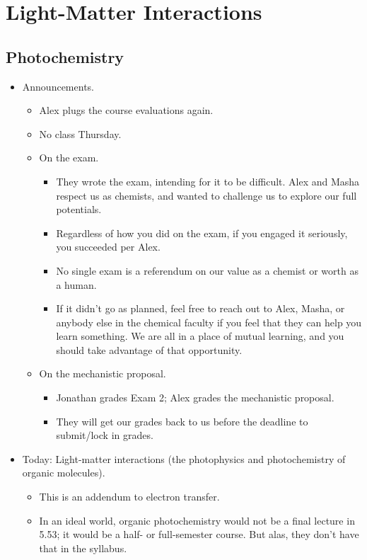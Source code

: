 \documentclass[../notes.tex]{subfiles}
\begin{document}
\chapter{Light-Matter Interactions}
\section{Photochemistry}
\begin{itemize}
    \item {}Announcements.
    \begin{itemize}
        \item Alex plugs the course evaluations again.
        \item No class Thursday.
        \item On the exam.
        \begin{itemize}
            \item They wrote the exam, intending for it to be difficult. Alex and Masha respect us as chemists, and wanted to challenge us to explore our full potentials.
            \item Regardless of how you did on the exam, if you engaged it seriously, you succeeded per Alex.
            \item No single exam is a referendum on our value as a chemist or worth as a human.
            \item If it didn't go as planned, feel free to reach out to Alex, Masha, or anybody else in the chemical faculty if you feel that they can help you learn something. We are all in a place of mutual learning, and you should take advantage of that opportunity.
        \end{itemize}
        \item On the mechanistic proposal.
        \begin{itemize}
            \item Jonathan grades Exam 2; Alex grades the mechanistic proposal.
            \item They will get our grades back to us before the deadline to submit/lock in grades.
        \end{itemize}
    \end{itemize}
    \item Today: Light-matter interactions (the photophysics and photochemistry of organic molecules).
    \begin{itemize}
        \item This is an addendum to electron transfer.
        \item In an ideal world, organic photochemistry would not be a final lecture in 5.53; it would be a half- or full-semester course. But alas, they don't have that in the syllabus.

\end{itemize}
\end{itemize}
\end{document}
